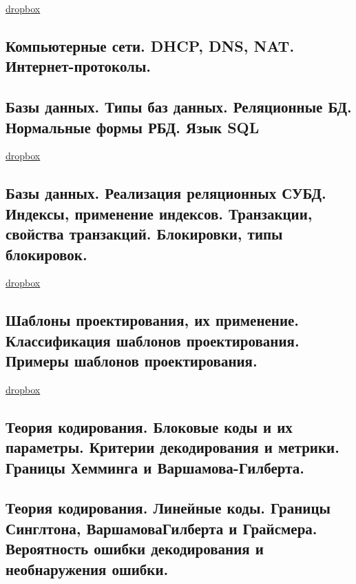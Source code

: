 \documentclass{article}
\begin{document}
\href{https://www.dropbox.com/sh/4st5b16mvdf8gkj/AAAI9sbKs_C3TFgRbqWGrAeca/Programming/16%20%D0%9A%D0%BE%D0%BC%D0%BF%D1%8C%D1%8E%D1%82%D0%B5%D1%80%D0%BD%D1%8B%D0%B5%20%D1%81%D0%B5%D1%82%D0%B8.pdf?dl=0}{dropbox}

\subsection{Компьютерные сети. DHCP, DNS, NAT. Интернет-протоколы.}

\subsection{Базы данных. Типы баз данных. Реляционные БД. Нормальные формы РБД. Язык SQL}

\href{https://www.dropbox.com/sh/4st5b16mvdf8gkj/AACJWcRNv0lFmPzhlkMSxN7Va/Programming/12%20%D0%91%D0%B0%D0%B7%D1%8B%20%D0%B4%D0%B0%D0%BD%D0%BD%D1%8B%D1%85.pdf?dl=0}{dropbox}

\subsection{Базы данных. Реализация реляционных СУБД. Индексы, применение индексов. Транзакции, свойства транзакций. Блокировки, типы блокировок.}

\href{https://www.dropbox.com/sh/4st5b16mvdf8gkj/AADo-NrUSL5vJLWDfeAFWwy1a/Programming/13%20%D0%A0%D0%B5%D0%BB%D1%8F%D1%86%D0%B8%D0%BE%D0%BD%D0%BD%D1%8B%D0%B5%20%D0%A1%D0%A3%D0%91%D0%94.pdf?dl=0}{dropbox}

\subsection{Шаблоны проектирования, их применение. Классификация шаблонов проектирования. Примеры шаблонов проектирования.}

\href{https://www.dropbox.com/sh/4st5b16mvdf8gkj/AACWB4gDVx73cjp5xudo1nGma/Programming/18%20%D0%A8%D0%B0%D0%B1%D0%BB%D0%BE%D0%BD%D1%8B%20%D0%BF%D1%80%D0%BE%D0%B5%D0%BA%D1%82%D0%B8%D1%80%D0%BE%D0%B2%D0%B0%D0%BD%D0%B8%D1%8F.pdf?dl=0}{dropbox}

\subsection{Теория кодирования. Блоковые коды и их параметры. Критерии декодирования и метрики. Границы Хемминга и Варшамова-Гилберта.}

\subsection{Теория кодирования. Линейные коды. Границы Синглтона, ВаршамоваГилберта и Грайсмера. Вероятность ошибки декодирования и необнаружения ошибки.}
\end{document}

